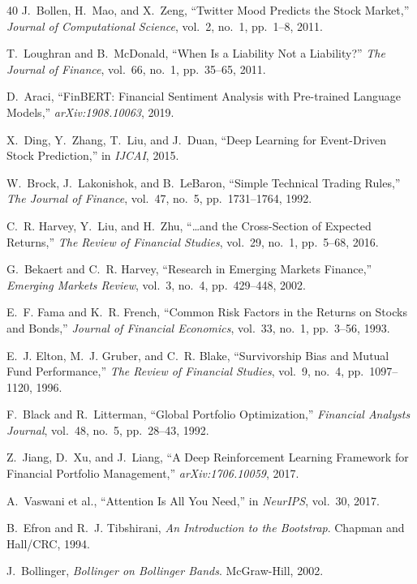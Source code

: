 \documentclass[12pt,a4paper]{article}
\begin{document}
\begin{thebibliography}{40}
J.~Bollen, H.~Mao, and X.~Zeng, ``Twitter Mood Predicts the Stock Market,'' \textit{Journal of Computational Science}, vol.~2, no.~1, pp.~1--8, 2011.

T.~Loughran and B.~McDonald, ``When Is a Liability Not a Liability?'' \textit{The Journal of Finance}, vol.~66, no.~1, pp.~35--65, 2011.

D.~Araci, ``FinBERT: Financial Sentiment Analysis with Pre-trained Language Models,'' \textit{arXiv:1908.10063}, 2019.

X.~Ding, Y.~Zhang, T.~Liu, and J.~Duan, ``Deep Learning for Event-Driven Stock Prediction,'' in \textit{IJCAI}, 2015.

W.~Brock, J.~Lakonishok, and B.~LeBaron, ``Simple Technical Trading Rules,'' \textit{The Journal of Finance}, vol.~47, no.~5, pp.~1731--1764, 1992.

C.~R. Harvey, Y.~Liu, and H.~Zhu, ``\ldots and the Cross-Section of Expected Returns,'' \textit{The Review of Financial Studies}, vol.~29, no.~1, pp.~5--68, 2016.

G.~Bekaert and C.~R. Harvey, ``Research in Emerging Markets Finance,'' \textit{Emerging Markets Review}, vol.~3, no.~4, pp.~429--448, 2002.

E.~F. Fama and K.~R. French, ``Common Risk Factors in the Returns on Stocks and Bonds,'' \textit{Journal of Financial Economics}, vol.~33, no.~1, pp.~3--56, 1993.

E.~J. Elton, M.~J. Gruber, and C.~R. Blake, ``Survivorship Bias and Mutual Fund Performance,'' \textit{The Review of Financial Studies}, vol.~9, no.~4, pp.~1097--1120, 1996.

F.~Black and R.~Litterman, ``Global Portfolio Optimization,'' \textit{Financial Analysts Journal}, vol.~48, no.~5, pp.~28--43, 1992.

Z.~Jiang, D.~Xu, and J.~Liang, ``A Deep Reinforcement Learning Framework for Financial Portfolio Management,'' \textit{arXiv:1706.10059}, 2017.

A.~Vaswani et al., ``Attention Is All You Need,'' in \textit{NeurIPS}, vol.~30, 2017.

B.~Efron and R.~J. Tibshirani, \textit{An Introduction to the Bootstrap}. Chapman and Hall/CRC, 1994.

J.~Bollinger, \textit{Bollinger on Bollinger Bands}. McGraw-Hill, 2002.

\end{thebibliography}
\end{document}
